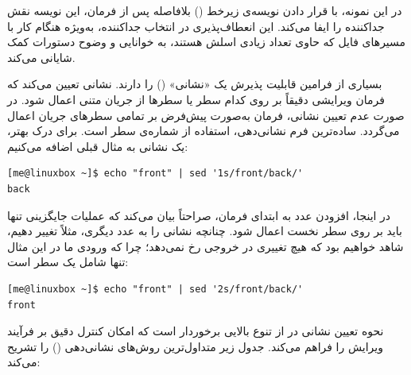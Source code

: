 در این نمونه، با قرار دادن نویسه‌ی زیرخط (\cmd{\_}) بلافاصله پس از فرمان، این نویسه نقش جداکننده را ایفا می‌کند. این انعطاف‌پذیری در انتخاب جداکننده، به‌ویژه هنگام کار با مسیرهای فایل که حاوی تعداد زیادی اسلش هستند، به خوانایی و وضوح دستورات کمک شایانی می‌کند.

بسیاری از فرامین  قابلیت پذیرش یک «نشانی» () را دارند. نشانی تعیین می‌کند که فرمان ویرایشی دقیقاً بر روی کدام سطر یا سطرها از جریان متنی اعمال شود. در صورت عدم تعیین نشانی، فرمان به‌صورت پیش‌فرض بر تمامی سطرهای جریان اعمال می‌گردد. ساده‌ترین فرم نشانی‌دهی، استفاده از شماره‌ی سطر است. برای درک بهتر، یک نشانی به مثال قبلی اضافه می‌کنیم:

\begin{latin}
\begin{lstlisting}
[me@linuxbox ~]$ echo "front" | sed '1s/front/back/'
back
\end{lstlisting}
\end{latin}

در اینجا، افزودن عدد  به ابتدای فرمان، صراحتاً بیان می‌کند که عملیات جایگزینی تنها باید بر روی سطر نخست اعمال شود. چنانچه نشانی را به عدد دیگری، مثلاً  تغییر دهیم، شاهد خواهیم بود که هیچ تغییری در خروجی رخ نمی‌دهد؛ چرا که ورودی ما در این مثال تنها شامل یک سطر است:

\begin{latin}
\begin{lstlisting}
[me@linuxbox ~]$ echo "front" | sed '2s/front/back/'
front
\end{lstlisting}
\end{latin}

نحوه تعیین نشانی در  از تنوع بالایی برخوردار است که امکان کنترل دقیق بر فرآیند ویرایش را فراهم می‌کند. جدول زیر متداول‌ترین روش‌های نشانی‌دهی () را تشریح می‌کند:

